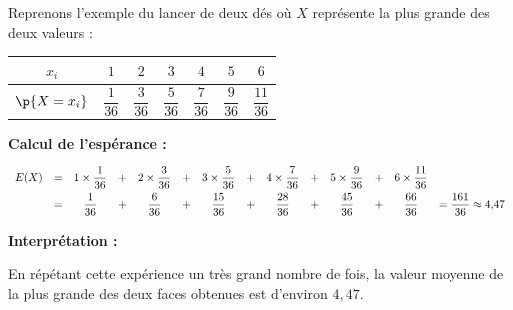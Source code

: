 \begin{ex}
	Reprenons l'exemple du lancer de deux dés où $X$ représente la plus grande des deux valeurs :

	\begin{center}
		\begin{tabular}{|c|c|c|c|c|c|c|} \hline
			\ccg $x_i$                             & $1$             & $2$             & $3$             & $4$             & $5$             & $6$              \\ \hline
			\rule[-4mm]{0mm}{11mm}\ccg $\p{X=x_i}$ & $\dfrac{1}{36}$ & $\dfrac{3}{36}$ & $\dfrac{5}{36}$ & $\dfrac{7}{36}$ & $\dfrac{9}{36}$ & $\dfrac{11}{36}$ \\ \hline
		\end{tabular}
	\end{center}

	\textbf{Calcul de l'espérance :}
	\[
		\def\arraystretch{2}
		\begin{array}{rccccccccccccl}
			E(X) & = & 1 \times \dfrac{1}{36} & + & 2 \times \dfrac{3}{36} & + & 3 \times \dfrac{5}{36} & + & 4 \times \dfrac{7}{36} & + & 5 \times \dfrac{9}{36} & + & 6 \times \dfrac{11}{36} &                                   \\
			     & = & \dfrac{1}{36}          & + & \dfrac{6}{36}          & + & \dfrac{15}{36}         & + & \dfrac{28}{36}         & + & \dfrac{45}{36}         & + & \dfrac{66}{36}          & = \dfrac{161}{36}  \approx 4{,}47
		\end{array}
	\]

	\textbf{Interprétation :}

	En répétant cette expérience un très grand nombre de fois, la valeur moyenne de la plus grande des deux faces obtenues est d'environ $4{,}47$.
\end{ex}

\newpage

